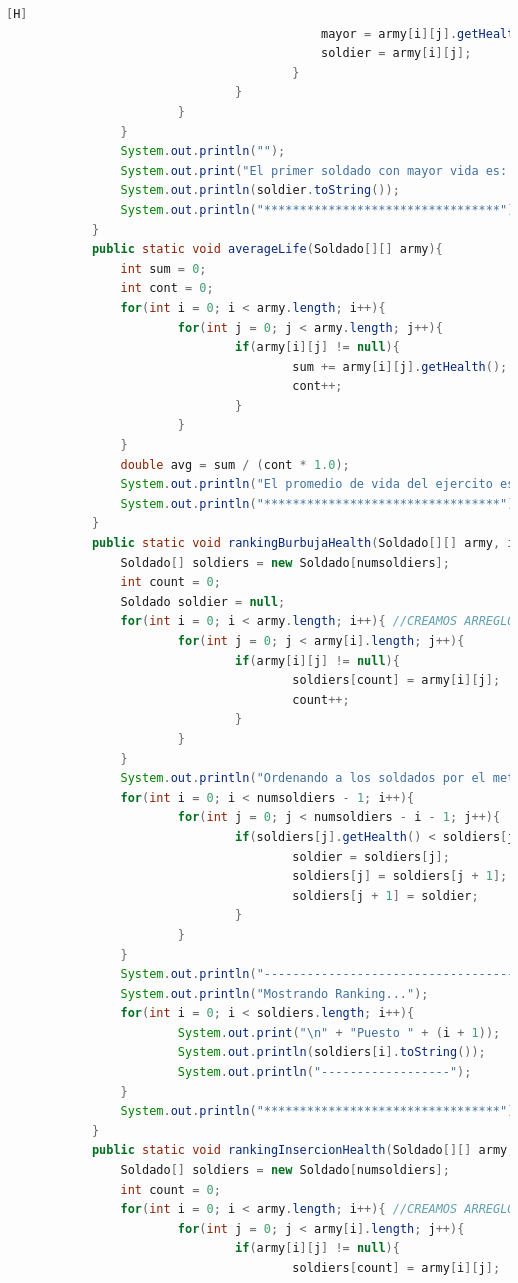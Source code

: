 \documentclass{article}
\begin{document}
\begin{lstlisting}[language=java,caption={Las lineas de codigos del metodo creado:}][H]
											mayor = army[i][j].getHealth();
											soldier = army[i][j];
										}
								}
						}
				}
				System.out.println("");
				System.out.print("El primer soldado con mayor vida es: ");
				System.out.println(soldier.toString());
				System.out.println("*********************************");
			}
			public static void averageLife(Soldado[][] army){
				int sum = 0;
				int cont = 0;
				for(int i = 0; i < army.length; i++){
						for(int j = 0; j < army.length; j++){
								if(army[i][j] != null){
										sum += army[i][j].getHealth();
										cont++;
								}
						}
				}
				double avg = sum / (cont * 1.0);
				System.out.println("El promedio de vida del ejercito es : " + avg);
				System.out.println("*********************************"); // AGREGANDOLO PARA HACER EL SIGUIENTE METODO Y SEPARARLOS
			}
			public static void rankingBurbujaHealth(Soldado[][] army, int numsoldiers){
				Soldado[] soldiers = new Soldado[numsoldiers];
				int count = 0;
				Soldado soldier = null;
				for(int i = 0; i < army.length; i++){ //CREAMOS ARREGLO PARA QUE LOS SOLDADOS SE TRASLADEN DE UN ARREGLO BIDIMENSIONAL A UNO DIMENSIONAL PARA APLICAR EL METODO BURBUJA
						for(int j = 0; j < army[i].length; j++){
								if(army[i][j] != null){
										soldiers[count] = army[i][j];
										count++;
								}
						}
				}
				System.out.println("Ordenando a los soldados por el metodo burbuja: "); //APLICAMOS EL METODO BURBUJA CON LOS PUNTOS DE VIDA
				for(int i = 0; i < numsoldiers - 1; i++){
						for(int j = 0; j < numsoldiers - i - 1; j++){
								if(soldiers[j].getHealth() < soldiers[j + 1].getHealth()){
										soldier = soldiers[j];
										soldiers[j] = soldiers[j + 1];
										soldiers[j + 1] = soldier;
								}
						}      
				}
				System.out.println("------------------------------------------");
				System.out.println("Mostrando Ranking...");
				for(int i = 0; i < soldiers.length; i++){
						System.out.print("\n" + "Puesto " + (i + 1));
						System.out.println(soldiers[i].toString());
						System.out.println("------------------");
				}
				System.out.println("*********************************");
			} 
			public static void rankingInsercionHealth(Soldado[][] army, int numsoldiers){
				Soldado[] soldiers = new Soldado[numsoldiers];
				int count = 0;
				for(int i = 0; i < army.length; i++){ //CREAMOS ARREGLO PARA QUE LOS SOLDADOS SE TRASLADEN DE UN ARREGLO BIDIMENSIONAL A UNO DIMENSIONAL PARA APLICAR EL METODO INSERCION
						for(int j = 0; j < army[i].length; j++){
								if(army[i][j] != null){
										soldiers[count] = army[i][j];

\end{lstlisting}
\end{document}
